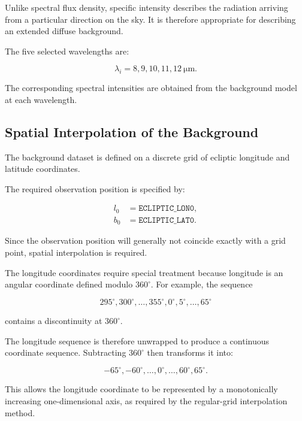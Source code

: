 \documentclass{article}
\begin{document}
Unlike spectral flux density, specific intensity describes the radiation arriving from a particular direction on the sky. It is therefore appropriate for describing an extended diffuse background.

The five selected wavelengths are:

\begin{equation}
\lambda_i = 8,9,10,11,12\ \mathrm{\mu m}.
\end{equation}

The corresponding spectral intensities are obtained from the background model at each wavelength.

\subsection{Spatial Interpolation of the Background}

The background dataset is defined on a discrete grid of ecliptic longitude and latitude coordinates.

The required observation position is specified by:

\begin{align}
l_0 &= \texttt{ECLIPTIC\_LON0},\\
b_0 &= \texttt{ECLIPTIC\_LAT0}.
\end{align}

Since the observation position will generally not coincide exactly with a grid point, spatial interpolation is required.


The longitude coordinates require special treatment because longitude is an angular coordinate defined modulo $360^\circ$. For example, the sequence

\begin{equation}
295^\circ,300^\circ,\ldots,355^\circ,0^\circ,
5^\circ,\ldots,65^\circ
\end{equation}

contains a discontinuity at $360^\circ$.

The longitude sequence is therefore unwrapped to produce a continuous coordinate sequence. Subtracting $360^\circ$ then transforms it into:

\begin{equation}
-65^\circ,-60^\circ,\ldots,0^\circ,\ldots,60^\circ,65^\circ.
\end{equation}

This allows the longitude coordinate to be represented by a monotonically increasing one-dimensional axis, as required by the regular-grid interpolation method.
\end{document}
